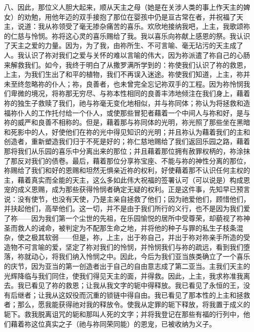 八、因此，那位义人胆大起来，顺从天主之母（她是在关涉人类的事上作天主的婢女）的劝勉，用他年迈的双手接抱了那位在婴孩中仍是亘古常在者，并祝福了天主，说道：我从祢领受了毫无掺杂痛苦的喜乐。欢欣地接纳我吧，上主，我歌颂祢的仁慈与怜悯。祢将这心灵的喜乐赐给了我。我以喜乐向祢献上感恩的祭。我认识了天主之爱的力量。因为，为了我，由祢所生、不可言喻、毫无玷污的天主成了人。我认识了祢对我们之爱与关怀的难以言喻的伟大，因为祢派遣了祢自己的心肠来解救我们。如今，我终于明白了从撒罗满所学到的：祢使我们认识了祢的救恩，上主，为我们生出了和平的植物，我们不再误入迷途。祢使我们知道，上主，祢并未至终忽略祢的仆人；祢，良善者，也未曾完全忘记祢双手的工程。因为祢怜悯我们卑微的境况，将祢那无穷尽、与祢本性相同的良善丰沛地倾注在我们身上，藉着祢的独生子救赎了我们，祂与祢毫无变化地相似，并与祢同体；祢认为将拯救和造福祢仆人的工作托付给一个仆人，或使那些冒犯者藉着一个中间人与祢和好，是与祢的威严和良善不相称的。但是，藉着那与祢同体的光明，祢光照了那些坐在黑暗和死影中的人，好使他们在祢的光中得见知识的光明；并且祢认为藉着我们的主和创造者，重新塑造我们归于不死是好的；祢仁慈地赐给了我们返回乐园之路，藉着那将我们从乐园的喜乐中分离出来的那位；并且藉着那位拥有赦罪权柄的，祢涂抹了那反对我们的债卷。最后，藉着那位分享祢宝座、不能与祢的神性分离的那位，祢赐给了我们和好的恩赐和坦然无惧亲近祢的权利，好使藉着那不认识任何主权的主，藉着真实而全能的天主，这么多如此伟大祝福的签署认可（可以说是）构成恩宠的成义恩赐，成为那些获得怜悯者确定无疑的权利。正是这件事，先知早已预言说：没有使节，也没有天使，乃是主亲自拯救了他们；因为祂爱他们，顾惜他们，并扶起他们，高举他们。这一切，并不是由于我们所行的义行，也不是因为我们爱了祢——因为我们第一个尘世的先祖，在乐园愉悦的居所中受尊荣，却藐视了祢神圣而救人的诫命，被判定为不配那生命之地，并将他的种子与罪的私生子枝条混杂，使之极其软弱——但是，祢，上主，出于祢自己，并出于祢对祢亲手所造的受造物不可言喻的爱，坚定了祢对我们的怜悯，并怜悯我们与祢的疏远，看到我们堕落，祢就动心，将我们纳入怜悯之中。因此，今后为我们亚当族类确立了一个喜乐的庆节，因为亚当的第一创造者出于自己的自由意志成了第二亚当。主我们天主的光辉降临与我们同住，使我们得见天主的面，并得救。因此，上主，我求祢准我离去。我已看见了祢的救恩；让我从我文字的轭中得释放。我已看见了永恒的王，没有后继者；让我从这奴役而沉重的锁链中得自由。我已看见了那本性的上主和拯救者；那么，愿我能获得祂对我的释放令。使我从定罪的轭下释放，将我置于成义的轭下。救我脱离诅咒的轭和那叫人死的文字；并将我登记在那些有福的行列中，他们藉着祢这位真实之子（祂与祢同荣同能）的恩宠，已被收纳为义子。\par

